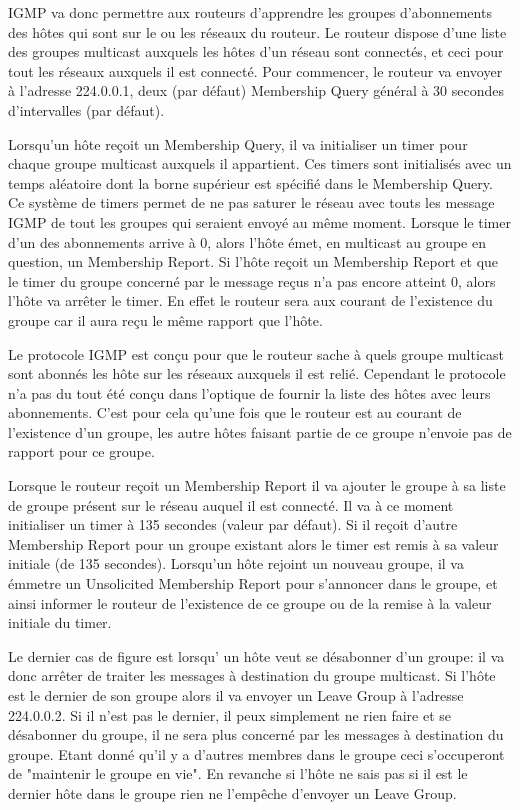 IGMP va donc permettre aux routeurs d'apprendre les groupes d'abonnements des
hôtes qui sont sur le ou les réseaux du routeur. Le routeur dispose d'une liste
des groupes multicast auxquels les hôtes d'un réseau sont connectés, et ceci
pour tout les réseaux auxquels il est connecté.  Pour commencer, le routeur va
envoyer à l'adresse 224.0.0.1, deux (par défaut) Membership Query général à 30
secondes d'intervalles (par défaut).

Lorsqu'un hôte reçoit un Membership Query, il va initialiser un timer pour
chaque groupe multicast auxquels il appartient. Ces timers sont initialisés
avec un temps aléatoire dont la borne supérieur est spécifié dans le Membership
Query. Ce système de timers permet de ne pas saturer le réseau avec touts les
message IGMP de tout les groupes qui seraient envoyé au même moment.  Lorsque
le timer d'un des abonnements arrive à 0, alors l'hôte émet, en multicast au
groupe en question, un Membership Report.  Si l'hôte reçoit un Membership
Report et que le timer du groupe concerné par le message reçus n'a pas encore
atteint 0, alors l'hôte va arrêter le timer. En effet le routeur sera aux
courant de l'existence du groupe car il aura reçu le même rapport que l'hôte.

Le protocole IGMP est conçu pour que le routeur sache à quels groupe multicast
sont abonnés les hôte sur les réseaux auxquels il est relié. Cependant le
protocole n'a pas du tout été conçu dans l'optique de fournir la liste des
hôtes avec leurs abonnements.  C'est pour cela qu'une fois que le routeur est
au courant de l'existence d'un groupe, les autre hôtes faisant partie de ce
groupe n'envoie pas de rapport pour ce groupe.

Lorsque le routeur reçoit un Membership Report il va ajouter le groupe à sa
liste de groupe présent sur le réseau auquel il est connecté. Il va à ce moment
initialiser un timer à 135 secondes (valeur par défaut).  Si il reçoit d'autre
Membership Report pour un groupe existant alors le timer est remis à sa valeur
initiale (de 135 secondes).  Lorsqu'un hôte rejoint un nouveau groupe, il va
émmetre un Unsolicited Membership Report pour s'annoncer dans le groupe, et
ainsi informer le routeur de l'existence de ce groupe ou de la remise à la
valeur initiale du timer.

Le dernier cas de figure est lorsqu' un hôte veut se désabonner d'un groupe: il
va donc arrêter de traiter les messages à destination du groupe multicast. Si
l'hôte est le dernier de son groupe alors il va envoyer un Leave Group à
l'adresse 224.0.0.2.  Si il n'est pas le dernier, il peux simplement ne rien
faire et se désabonner du groupe, il ne sera plus concerné par les messages à
destination du groupe. Etant donné qu'il y a d'autres membres dans le groupe
ceci s'occuperont de "maintenir le groupe en vie".  En revanche si l'hôte ne
sais pas si il est le dernier hôte dans le groupe rien ne l'empêche d'envoyer
un Leave Group.

